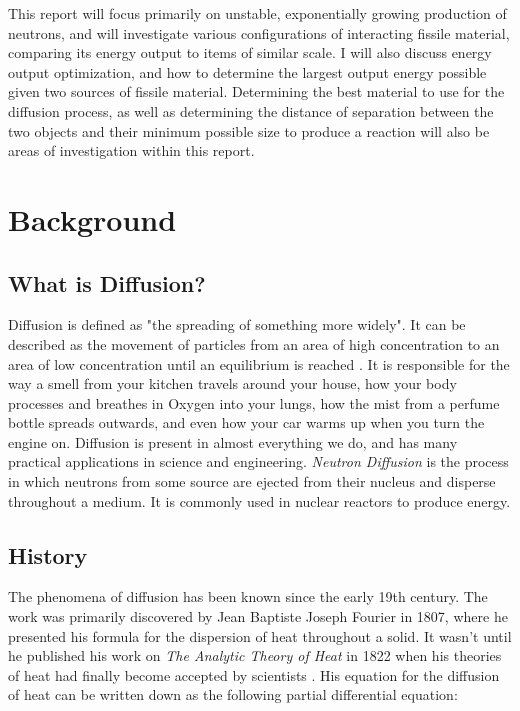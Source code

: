 \documentclass[letterpaper, 12pt]{article}
\begin{document}
      This report will focus primarily on unstable, exponentially growing production of neutrons, and will investigate various configurations of interacting fissile material, comparing its energy output to items of similar scale. I will also discuss energy output optimization, and how to determine the largest output energy possible given two sources of fissile material. Determining the best material to use for the diffusion process, as well as determining the distance of separation between the two objects and their minimum possible size to produce a reaction will also be areas of investigation within this report.

    \section{ Background}
      \subsection{What is Diffusion?}
         Diffusion is defined as "the spreading of something more widely". It can be described as the movement of particles from an area of high concentration to an area of low concentration until an equilibrium is reached \cite{Diffusion-Defn}. It is responsible for the way a smell from your kitchen travels around your house, how your body processes and breathes in Oxygen into your lungs, how the mist from a perfume bottle spreads outwards, and even how your car warms up when you turn the engine on. Diffusion is present in almost everything we do, and has many practical applications in science and engineering. \textit{Neutron Diffusion} is the process in which neutrons from some source are ejected from their nucleus and disperse throughout a medium. It is commonly used in nuclear reactors to produce energy. 

      \subsection{History}
         The phenomena of diffusion has been known since the early 19th century. The work was primarily discovered by Jean Baptiste Joseph Fourier in 1807, where he presented his formula for the dispersion of heat throughout a solid. It wasn't until he published his work on \textit{The Analytic Theory of Heat} in 1822 when his theories of heat had finally become accepted by scientists \cite{History}. His equation for the diffusion of heat can be written down as the following partial differential equation:
\end{document}
